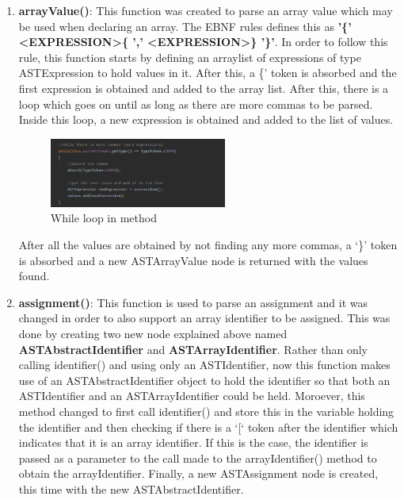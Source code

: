 \documentclass{article}
\begin{document}
\begin{enumerate}
	\item \textbf{arrayValue()}: This function was created to parse an array value which may be used when declaring an array. The EBNF rules defines this as \textbf{'\{' \textless EXPRESSION\textgreater \{ ',' \textless EXPRESSION\textgreater \} '\}'}. In order to follow this rule, this function starts by defining an arraylist of expressions of type ASTExpression to hold values in it. After this, a \{' token is absorbed and the first expression is obtained and added to the array list. After this, there is a loop which goes on until as long as there are more commas to be parsed. Inside this loop, a new expression is obtained and added to the list of values. 
	
	\begin{figure}[H]
					\centering
			 			\includegraphics[width=0.55\textwidth]{astarrayvaluewhile.png}
			  			\caption{While loop in method}
			  			\label{fig:astassignment}
					\end{figure}
					
	After all the values are obtained by not finding any more commas, a `\}' token is absorbed and a new ASTArrayValue node is returned with the values found.
	

				\item \textbf{assignment()}: This function is used to parse an assignment and it was changed in order to also support an array identifier to be assigned. This was done by creating two new node explained above named \textbf{ASTAbstractIdentifier} and \textbf{ASTArrayIdentifier}. Rather than only calling identifier() and using only an ASTIdentifier, now this function makes use of an ASTAbstractIdentifier object to hold the identifier so that both an ASTIdentifier and an ASTArrayIdentifier could be held. Moroever, this method changed to first call identifier() and store this in the variable holding the identifier and then checking if there is a `[` token after the identifier which indicates that it is an array identifier. If this is the case, the identifier is passed as a parameter to the call made to the arrayIdentifier() method to obtain the arrayIdentifier. Finally, a new ASTAssignment node is created, this time with the new ASTAbstractIdentifier.
				

\end{enumerate}
\end{document}
